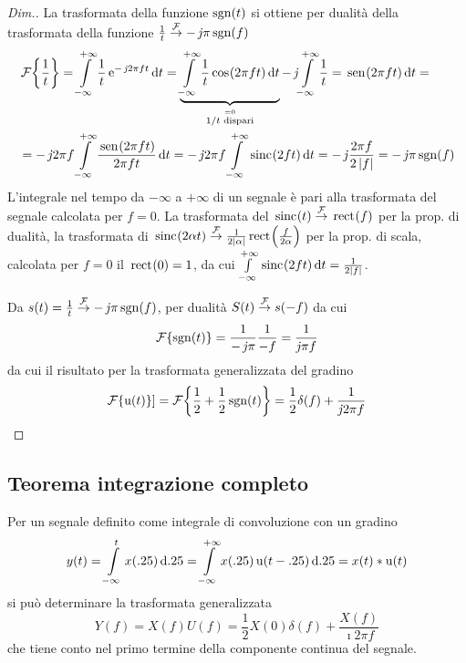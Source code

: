 \begin{proof}[Dim.]
La trasformata della funzione $\operatorname{sgn}(t)$ si ottiene per dualità della trasformata della funzione $\frac{1}{t}\overset{\operatorname{\mathcal{F}}}{\to}-\operatorname{\mathit{j}\!}\pi\operatorname{sgn}(f)$
\[\begin{split}&\fourier{\frac{1}{t}}=\intinf{\frac{1}{t}\e{-\imath 2\pi f t}}{t}= \underbrace{\intinf{\frac{1}{t}\cos{2\pi f t}}{t}}_{\stackrel{=0}{1/t \text{ dispari}}} -\imath\intinf{\frac{1}{t}=\sen{2\pi f t}}{t}=\\
&=-\imath 2\pi f\intinf{\frac{\sen{2\pi f t}}{2\pi f t}}{t}=-\imath 2\pi f\intinf{\sinc{2 f t}}{t}= -\imath\frac{2\pi f}{2\abs{f}} = -\imath\pi\sgn(f)
\end{split} \]
L'integrale nel tempo da $-\infty$ a $+\infty$ di un segnale è pari alla trasformata del segnale calcolata per $f=0$. La trasformata del $\,{\operatorname{sinc}}^{}\!\left({t}\right)\overset{\operatorname{\mathcal{F}}}{\to}\,{\operatorname{rect}}^{}\!\left({f}\right)$ per la prop. di dualità, la trasformata di $\,{\operatorname{sinc}}^{}\!\left({2\alpha t}\right)\overset{\operatorname{\mathcal{F}}}{\to}\frac{1}{2\left|{\alpha}\right|}\,{\operatorname{rect}}^{}\!\left({\frac{f}{2\alpha}}\right)$ per la prop. di scala, calcolata per $f=0$ il $\,{\operatorname{rect}}^{}\!\left({0}\right)=1$, da cui 
$\int\limits_{-\infty}^{+\infty}{\,{\operatorname{sinc}}^{}\!\left({2 f t}\right)}{\,\mathop{}\!\mathrm{d}{t}}=\frac{1}{2\left|{f}\right|}$.

Da $s(t)=\frac{1}{t}\overset{\operatorname{\mathcal{F}}}{\to} -\operatorname{\mathit{j}\!}\pi\operatorname{sgn}(f)$, per dualità $S(t)\overset{\operatorname{\mathcal{F}}}{\to} s(-f)$ da cui \[\operatorname{\mathcal{F}}\!\left\lbrace{\operatorname{sgn}(t)}\right\rbrace=\frac{1}{-\operatorname{\mathit{j}\!}\pi}\frac{1}{-f}=\frac{1}{\operatorname{\mathit{j}\!}\pi f}\] da cui il risultato per la trasformata generalizzata del gradino \[\operatorname{\mathcal{F}}\!\left\lbrace{\operatorname{u}(t)}\right\rbrace]=\operatorname{\mathcal{F}}\!\left\lbrace{\frac{1}{2}+\frac{1}{2}\operatorname{sgn}(t)}\right\rbrace=\frac{1}{2}\delta(f)+\frac{1}{\operatorname{\mathit{j}\!} 2\pi f}\]
\end{proof}

\subsection{Teorema integrazione completo}
Per un segnale definito come integrale di convoluzione con un gradino 
\[y(t)=\int\limits_{-\infty}^{t}{x(.25)}{\,\mathop{}\!\mathrm{d}{.25}}=\int\limits_{-\infty}^{+\infty}{x(.25)\operatorname{u}(t-.25)}{\,\mathop{}\!\mathrm{d}{.25}}=x(t)\ast\operatorname{u}(t)\] 
si può determinare la trasformata generalizzata 
\begin{equation}
Y(f)=X(f) U(f)=\frac{1}{2} X(0) \delta(f) + \frac{X(f)}{\imath 2\pi f}
\end{equation}
che tiene conto nel primo termine della componente continua del segnale.

